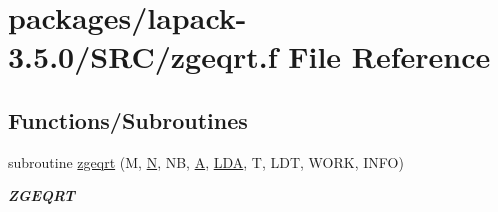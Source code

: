 \hypertarget{zgeqrt_8f}{}\section{packages/lapack-\/3.5.0/\+S\+R\+C/zgeqrt.f File Reference}
\label{zgeqrt_8f}
\subsection*{Functions/\+Subroutines}
\begin{DoxyCompactItemize}
\item 
subroutine \hyperlink{group__complex16GEcomputational_ga3e62c39db15928f660b34d3a107aee85}{zgeqrt} (M, \hyperlink{polmisc_8c_a0240ac851181b84ac374872dc5434ee4}{N}, N\+B, \hyperlink{classA}{A}, \hyperlink{example__user_8c_ae946da542ce0db94dced19b2ecefd1aa}{L\+D\+A}, T, L\+D\+T, W\+O\+R\+K, I\+N\+F\+O)
\begin{DoxyCompactList}\small\item\em {\bfseries Z\+G\+E\+Q\+R\+T} \end{DoxyCompactList}\end{DoxyCompactItemize}
